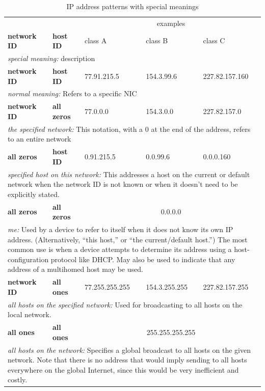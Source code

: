 \begin{table}
   \begin{tabularx}{\textwidth}{Xllll}
   \toprule
              &           & \multicolumn{3}{c}{examples}                                 \\
   \textbf{network ID} & \textbf{host ID}   & class A     & class B    & class C                           \\
   \multicolumn{5}{p{.9\textwidth}}{\small\textit{special meaning:} description}               \\
   \midrule
   \textbf{network ID} & \textbf{host ID}   & 77.91.215.5 & 154.3.99.6 & 227.82.157.160                    \\
   \multicolumn{5}{p{.9\textwidth}}{\small\textit{normal meaning:} Refers to a specific NIC}   \\
   \textbf{network ID} & \textbf{all zeros} & 77.0.0.0    & 154.3.0.0  & 227.82.157.0                      \\
   \multicolumn{5}{p{.9\textwidth}}{\small\textit{the specified network:}
   This notation, with a 0 at the end of the address, refers to an entire network}       \\
   \textbf{all zeros}  & \textbf{host ID}   & 0.91.215.5  & 0.0.99.6   & 0.0.0.160                         \\
   \multicolumn{5}{p{.9\textwidth}}{\small\textit{specified host on this network:}
   This addresses a host on the current or default network when the network ID is not known or when it doesn't need to be explicitly stated.} \\
   \textbf{all zeros}  & \textbf{all zeros} & \multicolumn{3}{c}{0.0.0.0}                           \\
   \multicolumn{5}{p{.9\textwidth}}{\small\textit{me:} Used by a device to refer to itself when it does not know its own IP address.
   (Alternatively, ``this host,'' or ``the current/default host.'')
   The most common use is when a device attempts to determine its address using a host-configuration protocol like DHCP.
   May also be used to indicate that any address of a multihomed host may be used.}      \\
   \textbf{network ID} & \textbf{all ones}  & 77.255.255.255 & 154.3.255.255 & 227.82.157.255              \\
   \multicolumn{5}{p{.9\textwidth}}{\small\textit{all hosts on the specified network:}
   Used for broadcasting to all hosts on the local network.}\\
   \textbf{all ones} & \textbf{all ones} & \multicolumn{3}{c}{255.255.255.255} \\
   \multicolumn{5}{p{.9\textwidth}}{\small\textit{all hosts on the network:}
   Specifies a global broadcast to all hosts on the given network.
   Note that there is no address that would imply sending to all hosts everywhere on the global Internet, since this would be very inefficient and costly.}\\
   \bottomrule
   \end{tabularx}
   \caption{IP address patterns with special meanings}
   \label{tab:ip-special-patterns}
\end{table}


